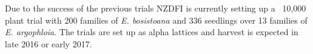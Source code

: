Due to the success of the previous trials NZDFI is currently setting up a ~10,000
plant trial with 200 families of \textit{E. bosistoana} and 336 seedlings over 13 families of \textit{E.
argophloia}. The trials are set up as alpha lattices and harvest is expected in
late 2016 or early 2017. 
